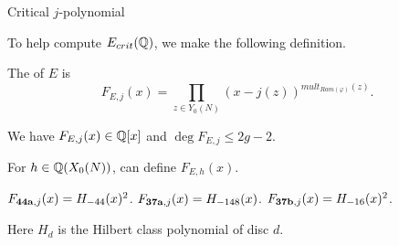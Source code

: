 \documentclass[handout]{beamer}
\begin{document}
\begin{frame}{Critical $j$-polynomial}





To help compute $E_{crit}(\mathbb{Q})$, we make the following definition. 
\begin{Def}
The  of $E$ is 
\[
F_{E,j}(x) = \prod_{z \in Y_0(N)}(x-j(z))^{mult_{Ram(\varphi)}(z)}.
\]
\end{Def}
We have $F_{E,j}(x) \in \mathbb{Q}[x]$ and $\deg F_{E,j} \leq 2g-2$.  

\pause
\medskip

For $h \in \mathbb{Q}(X_0(N))$, can define $F_{E,h}(x)$. 

\pause
\medskip


\begin{Example}
$F_{{\bf 44a},j}(x) = H_{-44}(x)^2$. $F_{{\bf 37a},j}(x) = H_{-148}(x)$. $F_{{\bf 37b},j}(x) = H_{-16}(x)^2$.
\end{Example}
Here $H_d$ is the Hilbert class polynomial of disc $d$. 


\end{frame}

\end{document}
